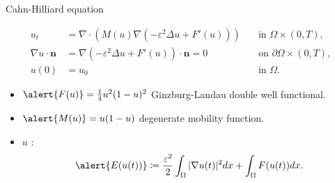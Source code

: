 \begin{frame}{Cahn-Hilliard equation}
	\begin{block}{}
		\vspace*{-0.4cm}
		\begin{equation*}
			\begin{aligned}
				u_t&= \nabla\cdot \left(M(u)\nabla\left(-\varepsilon^2\Delta u+F'(u)\right)\right)\quad&\text{in }\Omega\times(0,T),\\
				\nabla u\cdot \mathbf{n}&=\nabla(-\varepsilon^2\Delta u+F'(u))\cdot\mathbf{n}=0\quad&\text{on }\partial\Omega\times(0,T),\\
				u(0)&=u_0\quad&\text{in }\Omega.
			\end{aligned}
		\end{equation*}
	\end{block}
	\begin{itemize}
		\item $\alert{F(u)}=\frac{1}{4}u^2(1-u)^2$ Ginzburg-Landau double well functional.
		\item $\alert{M(u)}=u(1-u)$ degenerate mobility function.
		\item $u$ :
		$$\alert{E(u(t))}\coloneqq\frac{\varepsilon^2}{2}\int_\Omega|\nabla u(t)|^2dx+\int_\Omega F(u(t))dx.$$
	\end{itemize}
\end{frame}

